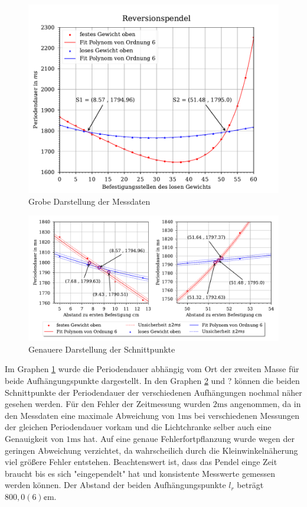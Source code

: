 \documentclass[11pt, a4paper]{article}
\begin{document}
    \begin{figure}[ht]
        \centering
        \includegraphics[width=120mm]{./Reversion_grob.pdf}

        \caption{Grobe Darstellung der Messdaten}
        \label{fig:revgrob}
    \end{figure}
    \begin{figure}[htb]
        \centering
        \includegraphics[width=\textwidth]{./Reversion_fein.pdf}

        \caption{Genauere Darstellung der Schnittpunkte}
        \label{fig:revfein1}
    \end{figure}

    Im Graphen \ref{fig:revgrob} wurde die Periodendauer abhängig vom Ort der zweiten Masse für beide Aufhängungspunkte dargestellt. 
    In den Graphen \ref{fig:revfein1} und ? können die beiden Schnittpunkte der Periodendauer der verschiedenen
    Aufhängungen nochmal näher gesehen werden. Für den Fehler der Zeitmessung
    wurden $2 \si{\milli\second}$ angenommen, da in den Messdaten eine maximale Abweichung von $1\si{\milli\second}$ bei verschiedenen Messungen 
    der gleichen Periodendauer vorkam und die Lichtchranke selber auch eine Genauigkeit von $1\si{\milli\second}$ hat.
    Auf eine genaue Fehlerfortpflanzung wurde wegen der geringen Abweichung verzichtet, da wahrscheilich
    durch die Kleinwinkelnäherung viel größere Fehler entstehen.
    Beachtenswert ist, dass das Pendel einge Zeit braucht bis es sich "eingependelt" hat und konsistente Messwerte
    gemessen werden können. Der Abstand der beiden Aufhängungspunkte $l_r$ beträgt $800,0(6)\si{\cent\metre}$.
\end{document}

